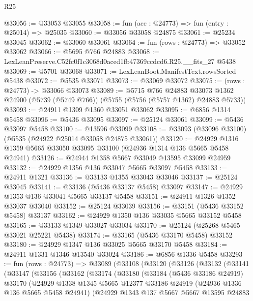 \begin{lexlean}{R25}
\begin{coremodule}
@33056 := @33053 @33055
@33058 := fun (acc : @24773) => fun (entry : @25014) => @25035
@33060 := @33056 @33058 @24875
@33061 := @25234 @33045
@33062 := @33060 @33061
@33064 := fun (rows : @24773) => @33052 @33062
@33066 := @5695 @766 @24883
@33068 := LexLeanPreserve.C52fc0f1c3068d0aced1fb47369ccdcd6.R25.__fits_27 @5438
@33069 := @5701 @33068
@33071 := LexLeanBoot.ManifestText.rowsSorted @5438
@33072 := @5535 @33071
@33073 := @33069 @33072
@33075 := (rows : @24773) -> @33066 @33073
@33089 := @5715
    @766
    @24883
    @33073
    @1362
    @24900
    (@5739 (@5749 @766))
    (@5755 (@5756 (@5757 @1362) @24883 @5733))
@33093 := @24911 @1309 @1360 @33051 @33062
@33095 := @6856 @1314 @5458
@33096 := @5436 @33095
@33097 := @25124 @33061
@33099 := @5436 @33097 @5458
@33100 := @13596 @33099
@33108 := @33093 (@33096 @33100) (@5535 (@24922 @25014 @33058 @24875 @33061))
@33120 := @24929 @1316 @1359 @5665 @33050 @33095 @33100 (@24936 @1314 @136 @5665 @5458 @24941)
@33126 := @24944 @1358 @5667 @33049 @13595 @33099 @24959
@33132 := @24929 @1356 @136 @33047 @5665 @33097 @5458
@33133 := @24911 @1321
@33136 := @33133 @1355 @33043 @33046
@33137 := @25124 @33045
@33141 := @33136 (@5436 @33137 @5458) @33097
@33147 := @24929 @1353 @136 @33041 @5665 @33137 @5458
@33151 := @24911 @1326 @1352 @33037 @33040
@33152 := @25124 @33039
@33156 := @33151 (@5436 @33152 @5458) @33137
@33162 := @24929 @1350 @136 @33035 @5665 @33152 @5458
@33165 := @33133 @1349 @33027 @33034
@33170 := @25124 (@25268 @5465 @33021 @25221 @5438)
@33174 := @33165 (@5436 @33170 @5458) @33152
@33180 := @24929 @1347 @136 @33025 @5665 @33170 @5458
@33184 := @24911 @1331 @1346 @13540 @33024
@33186 := @6856 @1336 @5458
@33293 := fun (rows : @24773) =>
  @33089
    (@33108
      (@33120
        (@33126
          (@33132
            (@33141
              (@33147
                (@33156
                  (@33162
                    (@33174
                      (@33180
                        (@33184
                          (@5436 @33186 @24919)
                          @33170
                          (@24929
                            @1338
                            @1345
                            @5665
                            @12377
                            @33186
                            @24919
                            (@24936 @1336 @136 @5665 @5458 @24941)
                            (@24929
                              @1343
                              @137
                              @5667
                              @5667
                              @13595
                              @24883

\end{coremodule}
\end{lexlean}
